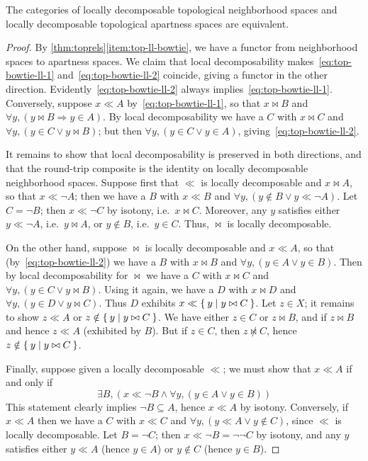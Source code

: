 \documentclass{article}
\def\cpl#1{\neg #1}
\let\implies\Rightarrow
\begin{document}
\begin{thm}\label{thm:top-locdec-equiv}
  The categories of
  locally decomposable topological neighborhood spaces and
  locally decomposable topological apartness spaces
  are equivalent.
\end{thm}
\begin{proof}
  By \cref{thm:toprels}\ref{item:top-ll-bowtie}, we have a functor from neighborhood spaces to apartness spaces.
  We claim that local decomposability makes~\eqref{eq:top-bowtie-ll-1} and~\eqref{eq:top-bowtie-ll-2} coincide, giving a functor in the other direction.
  Evidently~\eqref{eq:top-bowtie-ll-2} always implies~\eqref{eq:top-bowtie-ll-1}.
  Conversely, suppose $x\ll A$ by~\eqref{eq:top-bowtie-ll-1}, so that $x\bowtie B$ and $\forall y, (y\bowtie B \implies y\in A)$.
  By local decomposability we have a $C$ with $x\bowtie C$ and $\forall y, (y\in C \lor y\bowtie B)$; but then $\forall y, (y\in C \lor y\in A)$, giving~\eqref{eq:top-bowtie-ll-2}.

  It remains to show that local decomposability is preserved in both directions, and that the round-trip composite is the identity on locally decomposable neighborhood spaces.
  Suppose first that $\ll$ is locally decomposable and $x \bowtie A$, so that $x\ll \cpl{A}$; then we have a $B$ with $x\ll B$ and $\forall y, (y\notin B \lor y\ll \cpl{A})$.
  Let $C = \cpl{B}$; then $x\ll \cpl{C}$ by isotony, i.e.\ $x\bowtie C$.
  Moreover, any $y$ satisfies either $y\ll\cpl{A}$, i.e.\ $y\bowtie A$, or $y\notin B$, i.e.\ $y\in C$.
  Thus, $\bowtie$ is locally decomposable.

  On the other hand, suppose $\bowtie$ is locally decomposable and $x\ll A$, so that (by~\eqref{eq:top-bowtie-ll-2}) we have a $B$ with $x\bowtie B$ and $\forall y, (y\in A \lor y\in B)$.
  Then by local decomposability for $\bowtie$ we have a $C$ with $x\bowtie C$ and $\forall y, (y\in C \lor y\bowtie B)$.
  Using it again, we have a $D$ with $x\bowtie D$ and $\forall y, (y\in D \lor y\bowtie C)$.
  Thus $D$ exhibits $x\ll \Set{y|y\bowtie C}$.
  Let $z\in X$; it remains to show $z\ll A$ or $z\notin \Set{y|y\bowtie C}$.
  We have either $z\in C$ or $z\bowtie B$, and if $z\bowtie B$ and hence $z\ll A$ (exhibited by $B$).
  But if $z\in C$, then $z\not\bowtie C$, hence $z\notin \Set{y|y\bowtie C}$.

  Finally, suppose given a locally decomposable $\ll$; we must show that $x\ll A$ if and only if
  \[ \exists B, (x\ll \cpl{B} \land \forall y, (y\in A \lor y\in B)) \]
  This statement clearly implies $\cpl{B}\subseteq A$, hence $x\ll A$ by isotony.
  Conversely, if $x\ll A$ then we have a $C$ with $x\ll C$ and $\forall y, (y\ll A \lor y\notin C)$, since $\ll$ is locally decomposable.
  Let $B = \cpl{C}$; then $x\ll \cpl{B} = \cpl{\cpl{C}}$ by isotony,
  and any $y$ satisfies either $y\ll A$ (hence $y\in A$) or $y\notin C$ (hence $y\in B$).
\end{proof}
\end{document}
